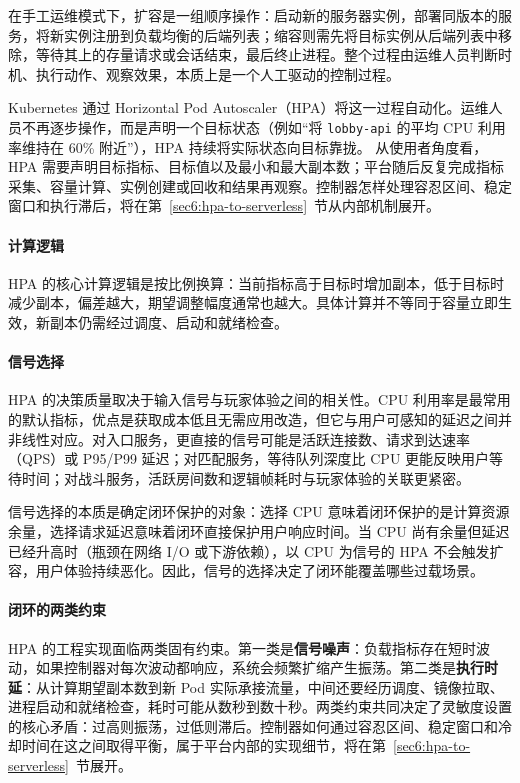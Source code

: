 在手工运维模式下，扩容是一组顺序操作：启动新的服务器实例，部署同版本的服务，将新实例注册到负载均衡的后端列表；缩容则需先将目标实例从后端列表中移除，等待其上的存量请求或会话结束，最后终止进程。整个过程由运维人员判断时机、执行动作、观察效果，本质上是一个人工驱动的控制过程。

Kubernetes 通过 Horizontal Pod Autoscaler（HPA）将这一过程自动化。运维人员不再逐步操作，而是声明一个目标状态（例如“将 \texttt{lobby-api} 的平均 CPU 利用率维持在 60\% 附近”），HPA 持续将实际状态向目标靠拢。
从使用者角度看，HPA 需要声明目标指标、目标值以及最小和最大副本数；平台随后反复完成指标采集、容量计算、实例创建或回收和结果再观察。控制器怎样处理容忍区间、稳定窗口和执行滞后，将在第~\ref{sec6:hpa-to-serverless}~节从内部机制展开。

\paragraph{计算逻辑}

HPA 的核心计算逻辑是按比例换算：当前指标高于目标时增加副本，低于目标时减少副本，偏差越大，期望调整幅度通常也越大。具体计算并不等同于容量立即生效，新副本仍需经过调度、启动和就绪检查。

\paragraph{信号选择}

HPA 的决策质量取决于输入信号与玩家体验之间的相关性。CPU 利用率是最常用的默认指标，优点是获取成本低且无需应用改造，但它与用户可感知的延迟之间并非线性对应。对入口服务，更直接的信号可能是活跃连接数、请求到达速率（QPS）或 P95/P99 延迟；对匹配服务，等待队列深度比 CPU 更能反映用户等待时间；对战斗服务，活跃房间数和逻辑帧耗时与玩家体验的关联更紧密。

信号选择的本质是确定闭环保护的对象：选择 CPU 意味着闭环保护的是计算资源余量，选择请求延迟意味着闭环直接保护用户响应时间。当 CPU 尚有余量但延迟已经升高时（瓶颈在网络 I/O 或下游依赖），以 CPU 为信号的 HPA 不会触发扩容，用户体验持续恶化。因此，信号的选择决定了闭环能覆盖哪些过载场景。

\paragraph{闭环的两类约束}

HPA 的工程实现面临两类固有约束。第一类是\textbf{信号噪声}：负载指标存在短时波动，如果控制器对每次波动都响应，系统会频繁扩缩产生振荡。第二类是\textbf{执行时延}：从计算期望副本数到新 Pod 实际承接流量，中间还要经历调度、镜像拉取、进程启动和就绪检查，耗时可能从数秒到数十秒。两类约束共同决定了灵敏度设置的核心矛盾：过高则振荡，过低则滞后。控制器如何通过容忍区间、稳定窗口和冷却时间在这之间取得平衡，属于平台内部的实现细节，将在第~\ref{sec6:hpa-to-serverless}~节展开。

